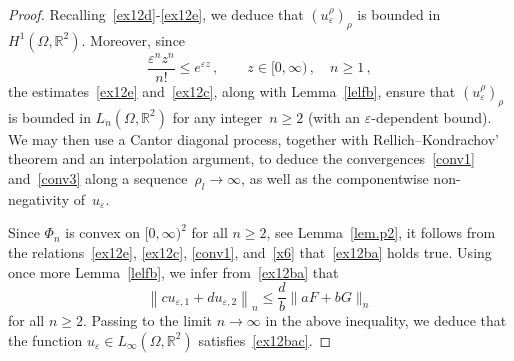 \documentclass[AHL,Unicode,longabstracts,published]{cedram}
\newcommand{\bbR}{\mathbb{R}}
\begin{document}
\begin{proof}
Recalling~\eqref{ex12d}-\eqref{ex12e}, we deduce that $(u_\varepsilon^\rho)_\rho$ is bounded in $H^1(\Omega,\bbR^2)$. Moreover, since
\begin{equation}\label{x6}
\frac{\varepsilon^n z^n}{n!} \le e^{\varepsilon z}\,, \qquad z\in [0,\infty)\,, \quad n\ge 1\,, 
\end{equation}
the estimates~\eqref{ex12e} and~\eqref{ex12c}, along with Lemma~\ref{lelfb}, ensure that $(u_\varepsilon^\rho)_\rho$ is bounded in $L_n(\Omega,\bbR^2)$ for any integer~$n\geq 2$ (with an $\varepsilon$-dependent bound). We may then use a Cantor diagonal process, together with Rellich--Kondrachov' theorem and an interpolation argument, to deduce the convergences~\eqref{conv1} and~\eqref{conv3} along a sequence~$\rho_l\to\infty$, as well as the componentwise non-negativity of~$u_\varepsilon$.

Since $\Phi_n$ is convex on $[0,\infty)^2$ for all $n\geq 2$, see Lemma~\ref{lem.p2}, it follows from the relations~\eqref{ex12e}, \eqref{ex12c}, \eqref{conv1}, and~\eqref{x6} that~\eqref{ex12ba} holds true. Using once more Lemma~\ref{lelfb}, we infer from~\eqref{ex12ba} that
\begin{equation*}
\left\|c u_{\varepsilon,1} + d u_{\varepsilon, 2}\right\|_n \le \frac{d}{b} \|a F + b G\|_n
\end{equation*}
for all $n\ge 2$. Passing to the limit $n\to\infty$ in the above inequality, we deduce that the function $u_\varepsilon\in L_\infty(\Omega,\bbR^2)$ satisfies~\eqref{ex12bac}.


\end{proof}
\end{document}
